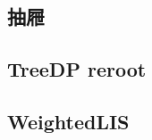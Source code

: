     \subsection{抽屜}
         \columnbreak
    \subsection{TreeDP reroot}
         \columnbreak
    \subsection{WeightedLIS}
        
\clearpage

%     
    

%         
